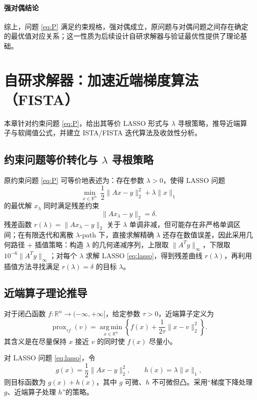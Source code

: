 \documentclass[UTF8]{ctexart}
\numberwithin{figure}{section}
\theoremstyle{definition}
\theoremstyle{examplestyle}
\theoremstyle{remark}
\begin{document}
\paragraph*{强对偶结论}
综上，问题 \eqref{eq:P} 满足约束规格，强对偶成立，原问题与对偶问题之间存在确定的最优值对应关系；这一性质为后续设计自研求解器与验证最优性提供了理论基础。

\section{自研求解器：加速近端梯度算法（FISTA）}
本章针对约束问题 \eqref{eq:P}，给出其等价 LASSO 形式与 $\lambda$ 寻根策略，推导近端算子与软阈值公式，并建立 ISTA/FISTA 迭代算法及收敛性分析。

\subsection{约束问题等价转化与 $\lambda$ 寻根策略}
\label{sec:lambda-root}

原约束问题 \eqref{eq:P} 可等价地表述为：存在参数 $\lambda>0$，使得 LASSO 问题
\begin{equation}
\label{eq:lasso}
\min_{x\in\mathbb{R}^n}\ \frac{1}{2}\|Ax-y\|_2^2+\lambda\|x\|_1
\end{equation}
的最优解 $x_\lambda$ 同时满足残差约束
\[
\|Ax_\lambda-y\|_2=\delta.
\]
残差函数 $r(\lambda)=\|Ax_\lambda-y\|_2$ 关于 $\lambda$ 单调非减，但可能存在非严格单调区间；在有限迭代和离散 $\lambda$-path 下，直接求解精确 $\lambda$ 还存在数值误差，因此采用几何路径 + 插值策略：构造 $\lambda$ 的几何递减序列，上限取 $\|A^Ty\|_\infty$，下限取 $10^{-6}\|A^Ty\|_\infty$；对每个 $\lambda$ 求解 LASSO \eqref{eq:lasso}，得到残差曲线 $r(\lambda)$，再利用插值方法寻找满足 $r(\lambda)=\delta$ 的目标 $\lambda$。

\subsection{近端算子理论推导}
\label{sec:prox}

对于闭凸函数 $f:\mathbb{R}^n\to(-\infty,+\infty]$，给定参数 $\tau>0$，近端算子定义为
\begin{equation}
\label{eq:prox-def}
\operatorname{prox}_{\tau f}(v)=\operatorname*{arg\,min}_{x\in\mathbb{R}^n}\left\{f(x)+\frac{1}{2\tau}\|x-v\|_2^2\right\}.
\end{equation}
其含义是在尽量保持 $x$ 接近 $v$ 的同时使 $f(x)$ 尽量小。

对 LASSO 问题 \eqref{eq:lasso}，令
\[
g(x)=\frac{1}{2}\|Ax-y\|_2^2,\qquad h(x)=\lambda\|x\|_1,
\]
则目标函数为 $g(x)+h(x)$，其中 $g$ 可微、$h$ 不可微但凸。采用“梯度下降处理 $g$、近端算子处理 $h$”的策略。
\end{document}

